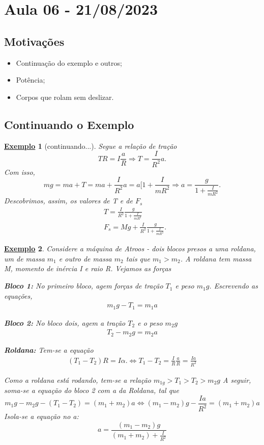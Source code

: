 \documentclass{article}
\newtheorem{example}{\underline{Exemplo}}
\begin{document}
\section{Aula 06 - 21/08/2023}
\subsection{Motivações}
\begin{itemize}
  \item Continuação do exemplo e outros;
  \item Potência;
  \item Corpos que rolam sem deslizar.
\end{itemize}
\subsection{Continuando o Exemplo}
\begin{example}[continuando...]
  Segue a relação de tração 
    \[
      TR = I \frac{a}{R} \Rightarrow T = \frac{I}{R^{2}}a.
    \] 
  Com isso, 
    \[
      mg = ma + T = ma + \frac{I}{R^{2}}a = a[1 + \frac{I}{mR^{2}} \Rightarrow a = \frac{g}{1 + \frac{I}{mR^{2}}}.
    \]
  Descobrimos, assim, os valores de T e de \(F_{s}\)
 \begin{align*}
   &T = \frac{I}{R^{2}}\frac{g}{1+ \frac{I}{mR^{2}}}\\
   &F_{s} = Mg + \frac{I}{R^{2}}\frac{g}{1+\frac{I}{mR^{2}}}.
 \end{align*}
 \end{example} 
\begin{example}
  Considere a máquina de Atroos - dois blocos presos a uma roldana, um de massa \(m_{1}\) e outro de massa \(m_{2}\) tais que \(m_{1} > m_{2}\).
A roldana tem massa M, momento de inércia I e raio R. Vejamos as forças

  \textbf{Bloco 1:}
    No primeiro bloco, agem forças de tração \(T_{1}\) e peso \(m_{1}g\). Escrevendo as equações,
   \begin{align*}
     m_{1}g - T_{1} = m_{1}a
   \end{align*}

  \textbf{Bloco 2:}
    No bloco dois, agem a tração \(T_{2}\) e o peso \(m_{2}g\)
   \begin{align*}
     T_{2}-m_{2}g = m_{2}a
   \end{align*}

  \textbf{Roldana:}
    Tem-se a equação 
   \begin{align*}
     (T_{1} - T_{2})R = I\alpha. \Longleftrightarrow T_{1} - T_{2} = \frac{I}{R}\frac{a}{R} = \frac{Ia}{R^{2}}
   \end{align*}

  Como a roldana está rodando, tem-se a relação \(m_{1g} > T_{1} > T_{2} > m_{2}g\)
A seguir, soma-se a equação do bloco 2 com a da Roldana, tal que 
  \[
    m_{1}g - m_{2}g - (T_{1}-T_{2}) = (m_{1}+m_{2})a \Longleftrightarrow (m_{1}-m_{2})g - \frac{Ia}{R^{2}} = (m_{1}+m_{2})a
  \]
  Isola-se a equação no a: 
    \[
      a = \frac{(m_{1}-m_{2})g}{(m_{1}+m_{2})+\frac{I}{R^{2}}}
    \]
\end{example}
\end{document}
